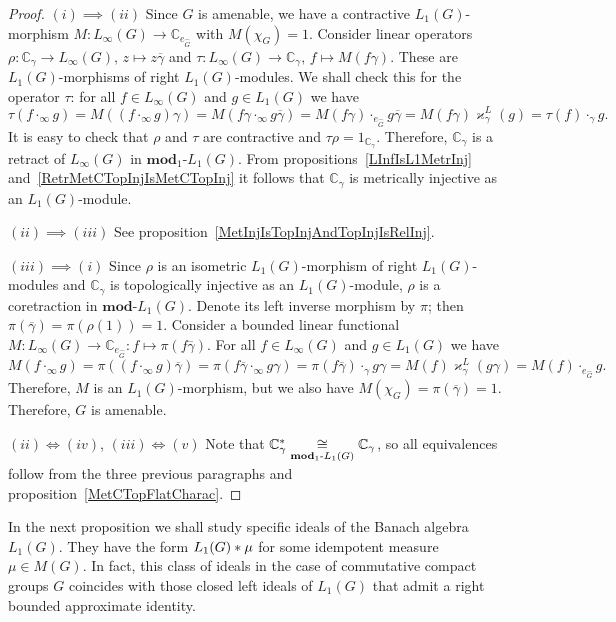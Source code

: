 \begin{proof} $(i)\implies (ii)$ Since $G$ is amenable, we have a 
contractive $L_1(G)$-morphism $M:L_\infty(G)\to\mathbb{C}_{e_{\widehat{G}}}$
with $M(\chi_G)=1$. Consider linear 
operators $\rho:\mathbb{C}_\gamma\to L_\infty(G),\, z\mapsto z\overline{\gamma}$ 
and $\tau:L_\infty(G)\to\mathbb{C}_\gamma,\, f\mapsto M(f\gamma)$. These are
$L_1(G)$-morphisms of right $L_1(G)$-modules. We shall check this for the operator
$\tau$: for all $f\in L_\infty(G)$ and $g\in L_1(G)$ we have
\[
\tau(f\cdot_\infty g)
=M((f\cdot_\infty g)\gamma)
=M(f\gamma\cdot_\infty g\overline{\gamma})
=M(f\gamma)\cdot_{e_{\widehat{G}}} g\overline{\gamma}
=M(f\gamma)\varkappa_\gamma^L(g)
=\tau(f)\cdot_{\gamma} g.
\]  
It is easy to check that $\rho$ and $\tau$ are contractive and
$\tau\rho=1_{\mathbb{C}_\gamma}$. Therefore, $\mathbb{C}_\gamma$ is a retract of
$L_\infty(G)$ in $\mathbf{mod}_1\text{-}L_1(G)$. From
propositions~\ref{LInfIsL1MetrInj} and~\ref{RetrMetCTopInjIsMetCTopInj} it 
follows that $\mathbb{C}_\gamma$ is metrically injective as an $L_1(G)$-module.

$(ii)\implies (iii)$ See proposition~\ref{MetInjIsTopInjAndTopInjIsRelInj}.

$(iii) \implies (i)$ Since $\rho$ is an isometric $L_1(G)$-morphism of right
$L_1(G)$-modules and $\mathbb{C}_\gamma$ is topologically injective as
an $L_1(G)$-module, $\rho$ is a coretraction in $\mathbf{mod}\text{-}L_1(G)$. Denote
its left inverse morphism by $\pi$; then
$\pi(\overline{\gamma})=\pi(\rho(1))=1$. Consider a bounded linear functional
$M:L_\infty(G)\to\mathbb{C}_{e_{\widehat{G}}}:f\mapsto \pi(f\overline{\gamma})$. For all
$f\in L_\infty(G)$ and $g\in L_1(G)$ we have
\[
M(f\cdot_\infty g)
=\pi((f\cdot_\infty g)\overline{\gamma})
=\pi(f\overline{\gamma}\cdot_\infty g\gamma)
=\pi(f\overline{\gamma})\cdot_{\gamma} g\gamma
=M(f)\varkappa_\gamma^L(g\gamma)
=M(f)\cdot_{e_{\widehat{G}}}g.
\]
Therefore, $M$ is an $L_1(G)$-morphism, but we also have
$M(\chi_G)=\pi(\overline{\gamma})=1$. Therefore, $G$ is amenable.

$(ii) \Longleftrightarrow (iv)$, $(iii) \Longleftrightarrow (v)$ Note that
$\mathbb{C}_\gamma^*\mathrel{\mathop{\cong}\limits_{\mathbf{mod}_1\text{-}L_1(G)}}\mathbb{C}_\gamma$, so all
equivalences  follow from the three previous paragraphs and
proposition~\ref{MetCTopFlatCharac}.
\end{proof}

In the next proposition we shall study specific ideals of the Banach algebra
$L_1(G)$. They have the form $L_1(G)\ast\mu$ for some idempotent measure
$\mu\in M(G)$. In fact, this class of ideals in the case of commutative compact groups $G$
coincides with those closed left ideals of $L_1(G)$ that admit a right bounded
approximate identity.

